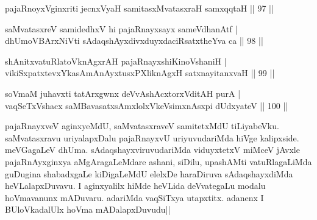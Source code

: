 \begin{shl}
pajaRnoyxV\s ginxriti jecnxVyaH samitasxMvatasxraH samxqqtaH \hfill|| 97 || 
\end{shl}

\begin{shl}
saMvatasxreV samidedhxV hi pajaRnayxsayx sameVdhanAtf | \\
dhUmoV\s BArxNiVti sAdaqshAyxdivxduyxdaciRsatxtheYva ca \hfill|| 98 || 
\end{shl}

\begin{shl}
shAnitxvatuRlatoV\s knAgxrAH pajaRnayxshiKinoV\s shaniH | \\
vikiSxpatxtevxYkasAmAnAyxtusxPXliknAgxH satxnayitanxvaH \hfill|| 99 || 
\end{shl}

\begin{shl}
soVmaM juhavxti tatArxgwnx deVvAshAcxtorxVditAH purA | \\
vaqSeTxVshacx saMBavasatxsAmxlolxVkeV\s simxnAsx\s pi dUdxyateV \hfill|| 100 || 
\end{shl}

\begin{artha}
pajaRnayxveV aginxyeMdU, saMvatasxraveV samitetxMdU tiLiyabeVku. 
saMvatasxravu uriyalapxDalu pajaRnayxvU uriyuvudariMda hiVge 
kalipxside. meVGagaLeV dhUma. sAdaqshayxviruvudariMda viduyxtetxV 
miMceV jAvxle pajaRnAyxginxya aMgAragaLeMdare ashani, siDilu, 
upashAMti vatuRlagaLiMda guDugina shabadxgaLe kiDigaLeMdU elelxDe 
haraDiruva sAdaqshayxdiMda heVLalapxDuvavu. I aginxyalilx hiMde 
heVLida deVvategaLu modalu hoVmavanunx mADuvaru. adariMda vaqSiTxya 
utapxtitx. adanenx I BUloVkadalUlx hoVma mADalapxDuvudu||
\end{artha}
